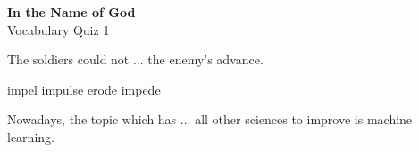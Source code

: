 \documentclass{exam}
\begin{document}
\begin{center}
\textbf{In the Name of God}\\ 
Vocabulary Quiz 1
\end{center}
\vspace{5mm}
\begin{questions}


\question The soldiers could not ... the enemy's advance.\\
\begin{oneparchoices}
 \choice impel
 \choice impulse
 \choice erode 
 \correctchoice impede
\end{oneparchoices}

\question Nowadays, the topic which has ... all other sciences to improve is machine learning.\\
\begin{oneparchoices}
 

\end{oneparchoices}
\end{questions}
\end{document}
